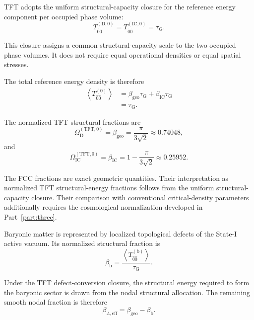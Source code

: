TFT adopts the uniform structural-capacity closure for the reference energy component per occupied phase volume:
\begin{equation}
    T_{\hat{0}\hat{0}}^{(\mathrm{D},0)} = T_{\hat{0}\hat{0}}^{(\mathrm{IC},0)} = \tau_{\mathrm{G}}.
\end{equation}

This closure assigns a common structural-capacity scale to the two occupied phase volumes. It does not require equal operational densities or equal spatial stresses.

The total reference energy density is therefore
\begin{equation}
\begin{aligned}
    \left\langle T_{\hat{0}\hat{0}}^{(0)} \right\rangle &= \beta_{\mathrm{geo}}\tau_{\mathrm{G}} + \beta_{\mathrm{IC}}\tau_{\mathrm{G}} \\
    &= \tau_{\mathrm{G}}.
\end{aligned}
\end{equation}

The normalized TFT structural fractions are
\begin{equation}
    \Omega_{\mathrm{D}}^{(\mathrm{TFT},0)} = \beta_{\mathrm{geo}} = \frac{\pi}{3\sqrt{2}} \approx 0.74048,
\end{equation}
and
\begin{equation}
    \Omega_{\mathrm{IC}}^{(\mathrm{TFT},0)} = \beta_{\mathrm{IC}} = 1-\frac{\pi}{3\sqrt{2}} \approx 0.25952.
\end{equation}

The FCC fractions are exact geometric quantities. Their interpretation as normalized TFT structural-energy fractions follows from the uniform structural-capacity closure. Their comparison with conventional critical-density parameters additionally requires the cosmological normalization developed in Part~\ref{part:three}.

Baryonic matter is represented by localized topological defects of the State-I active vacuum. Its normalized structural fraction is
\begin{equation}
    \beta_{\mathrm{b}} = \frac{ \left\langle T_{\hat{0}\hat{0}}^{(\mathrm{b})} \right\rangle }{ \tau_{\mathrm{G}} }.
\end{equation}

Under the TFT defect-conversion closure, the structural energy required to form the baryonic sector is drawn from the nodal structural allocation. The remaining smooth nodal fraction is therefore
\begin{equation}
    \beta_{\Lambda,\mathrm{eff}} = \beta_{\mathrm{geo}} - \beta_{\mathrm{b}}.
\end{equation}

